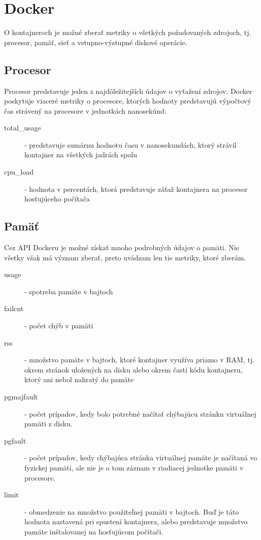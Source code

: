 \documentclass[printed,11pt,twoside,color,cover,table]{fithesis3}
\begin{document}
\section{Docker}
O kontajneroch je možné zberať metriky o všetkých požadovaných zdrojoch, tj. procesor, pamäť, sieť a vstupno-výstupné diskové operácie.

\subsection{Procesor}
Procesor predstavuje jeden z najdôležitejších údajov o vyťažení zdrojov. Docker poskytuje viaceré metriky o procesore, ktorých hodnoty 
predstavujú výpočtový čas strávený na procesore v jednotkách nanosekúnd: 
\begin{description}
\item[total\_usage] - predstavuje sumárnu hodnotu času v nanosekundách, ktorý strávil kontajner na všetkých jadrách spolu
\item[cpu\_load] - hodnota v percentách, ktorá predstavuje záťaž kontajnera na procesor hosťujúceho počítača
\end{description}

\subsection{Pamäť}
Cez API Dockeru je možné získať mnoho podrobných údajov o pamäti. Nie všetky však má význam zberať, preto uvádzam len tie metriky, ktoré zberám.
\begin{description}
\item[usage] - spotreba pamäte v bajtoch
\item[failcnt] - počet chýb v pamäti
\item[rss] - množstvo pamäte v bajtoch, ktoré kontajner využíva priamo v RAM, tj. okrem stránok uložených na disku alebo okrem častí kódu kontajneru, ktorý ani nebol nahratý do pamäte
\item[pgmajfault] - počet prípadov, kedy bolo potrebné načítať chýbajúcu stránku virtuálnej pamäti z disku.
\item[pgfault] - počet prípadov, kedy chýbajúca stránka virtuálnej pamäte je načítaná vo fyzickej pamäti, ale nie je o tom záznam v riadiacej jednotke pamäti v procesore.
\item[limit] - obmedzenie na množstvo použiteľnej pamäti v bajtoch. Buď je táto hodnota nastavená pri spustení kontajnera, alebo predstavuje množstvo pamäte inštalovanej na hosťujúcom počítači.
\end{description}
\end{document}
